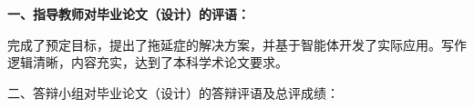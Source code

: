 \cleardoublepage{}

{
    \bfseries
    \noindent 一、指导教师对毕业论文（设计）的评语：\\

    \setlength{\parindent}{2em}
    
    \par 完成了预定目标，提出了拖延症的解决方案，并基于智能体开发了实际应用。写作逻辑清晰，内容充实，达到了本科学术论文要求。

    \signature{指导教师（签名）}

    \noindent 二、答辩小组对毕业论文（设计）的答辩评语及总评成绩：\\

    \mbox{} \vfill

    \finaleval[][][][][]

    \signature{负责人（签名）}
}
